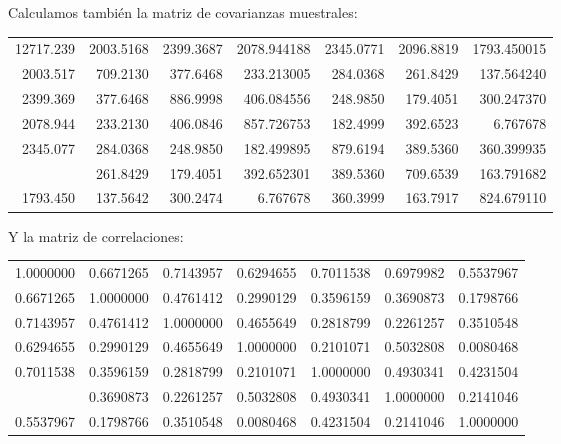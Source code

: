 \documentclass[
  12pt,
]{extreport}
\begin{document}
Calculamos también la matriz de covarianzas muestrales:

\begin{table}[H]
\centering\begingroup\fontsize{9}{11}\selectfont

\begin{tabular}{rrrrrrr}
\toprule
12717.239 & 2003.5168 & 2399.3687 & 2078.944188 & 2345.0771 & 2096.8819 & 1793.450015\\
2003.517 & 709.2130 & 377.6468 & 233.213005 & 284.0368 & 261.8429 & 137.564240\\
2399.369 & 377.6468 & 886.9998 & 406.084556 & 248.9850 & 179.4051 & 300.247370\\
2078.944 & 233.2130 & 406.0846 & 857.726753 & 182.4999 & 392.6523 & 6.767678\\
2345.077 & 284.0368 & 248.9850 & 182.499895 & 879.6194 & 389.5360 & 360.399935\\
\addlinespace
2096.882 & 261.8429 & 179.4051 & 392.652301 & 389.5360 & 709.6539 & 163.791682\\
1793.450 & 137.5642 & 300.2474 & 6.767678 & 360.3999 & 163.7917 & 824.679110\\
\bottomrule
\end{tabular}
\endgroup{}
\end{table}

Y la matriz de correlaciones:

\begin{table}[H]
\centering\begingroup\fontsize{9}{11}\selectfont

\begin{tabular}{rrrrrrr}
\toprule
1.0000000 & 0.6671265 & 0.7143957 & 0.6294655 & 0.7011538 & 0.6979982 & 0.5537967\\
0.6671265 & 1.0000000 & 0.4761412 & 0.2990129 & 0.3596159 & 0.3690873 & 0.1798766\\
0.7143957 & 0.4761412 & 1.0000000 & 0.4655649 & 0.2818799 & 0.2261257 & 0.3510548\\
0.6294655 & 0.2990129 & 0.4655649 & 1.0000000 & 0.2101071 & 0.5032808 & 0.0080468\\
0.7011538 & 0.3596159 & 0.2818799 & 0.2101071 & 1.0000000 & 0.4930341 & 0.4231504\\
\addlinespace
0.6979982 & 0.3690873 & 0.2261257 & 0.5032808 & 0.4930341 & 1.0000000 & 0.2141046\\
0.5537967 & 0.1798766 & 0.3510548 & 0.0080468 & 0.4231504 & 0.2141046 & 1.0000000\\
\bottomrule
\end{tabular}
\endgroup{}
\end{table}
\end{document}
